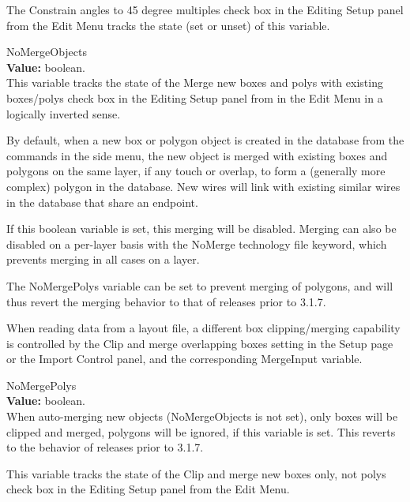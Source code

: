 \begin{description}
The {\cb Constrain angles to 45 degree multiples} check box in the
{\cb Editing Setup} panel from the {\cb Edit Menu} tracks the state
(set or unset) of this variable.

\item{\et NoMergeObjects}\\
{\bf Value:} boolean.\\
This variable tracks the state of the {\cb Merge new boxes and polys
with existing boxes/polys} check box in the {\cb Editing Setup} panel
from in the {\cb Edit Menu} in a logically inverted sense.

By default, when a new box or polygon object is created in the
database from the commands in the side menu, the new object is merged
with existing boxes and polygons on the same layer, if any touch or
overlap, to form a (generally more complex) polygon in the database. 
New wires will link with existing similar wires in the database that
share an endpoint.

If this boolean variable is set, this merging will be disabled. 
Merging can also be disabled on a per-layer basis with the {\vt
NoMerge} technology file keyword, which prevents merging in all cases
on a layer.

The {\et NoMergePolys} variable can be set to prevent merging of
polygons, and will thus revert the merging behavior to that of
releases prior to 3.1.7.

When reading data from a layout file, a different box clipping/merging
capability is controlled by the {\cb Clip and merge overlapping boxes}
setting in the {\cb Setup} page or the {\cb Import Control} panel, and
the corresponding {\et MergeInput} variable.

\item{\et NoMergePolys}\\
{\bf Value:} boolean.\\
When auto-merging new objects ({\et NoMergeObjects} is not set), only
boxes will be clipped and merged, polygons will be ignored, if this
variable is set.  This reverts to the behavior of releases prior to
3.1.7.

This variable tracks the state of the {\cb Clip and merge new boxes
only, not polys} check box in the {\cb Editing Setup} panel from the
{\cb Edit Menu}.


\end{description}
